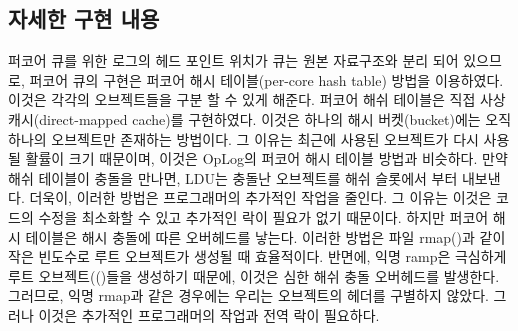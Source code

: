 \subsection{자세한 구현 내용}
퍼코어 큐를 위한 로그의 헤드 포인트 위치가 큐는 원본 자료구조와 분리 되어 있으므로, 
퍼코어 큐의 구현은 퍼코어 해시 테이블(per-core hash table) 방법을 이용하였다. 이것은
각각의 오브젝트들을 구분 할 수 있게 해준다.
퍼코어 해쉬 테이블은 직접 사상 캐시(direct-mapped cache)를 구현하였다. 이것은 하나의
 해시 버켓(bucket)에는 오직 하나의 오브젝트만 존재하는 방법이다.
그 이유는 최근에 사용된 오브젝트가 다시 사용될 활률이 크기 때문이며, 이것은 OpLog의 
퍼코어 해시 테이블 방법과 비슷하다.
만약 해쉬 테이블이 충돌을 만나면, LDU는 충돌난 오브젝트를 해쉬 슬롯에서 부터 내보낸다.
더욱이, 이러한 방법은 프로그래머의 추가적인 작업을 줄인다. 
그 이유는 이것은 코드의 수정을 최소화할 수 있고 추가적인 락이 필요가 없기 때문이다.
하지만 퍼코어 해시 테이블은 해시 충돌에 따른 오버헤드를 낳는다.
이러한 방법은 파일 rmap()과 같이
 작은 빈도수로 루트 오브젝트가 생성될 때 효율적이다. 
반면에, 익명 ramp은 극심하게 루트 오브젝트(()들을 생성하기 때문에, 
이것은 심한 해쉬 충돌 오버헤드를 발생한다. 
그러므로, 익명 rmap과 같은 경우에는 우리는 오브젝트의 헤더를 구별하지 않았다. 
그러나 이것은 추가적인 프로그래머의 작업과 전역 락이 필요하다.



